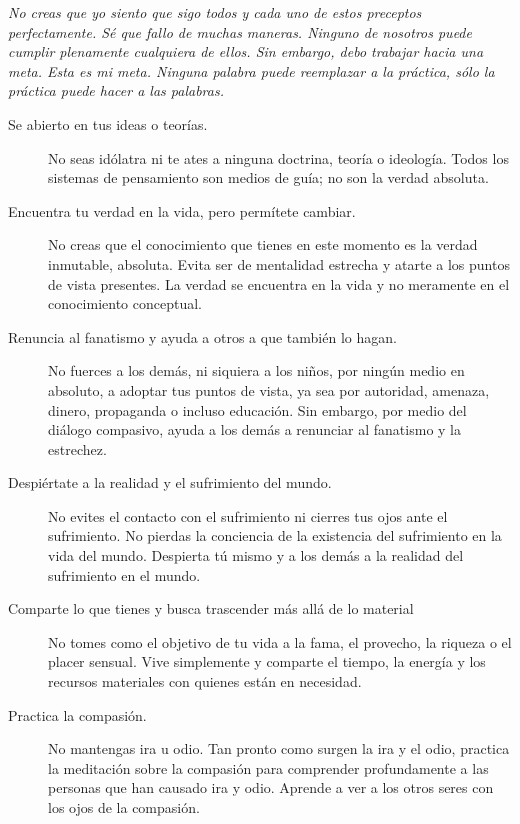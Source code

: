 \documentclass[11pt]{article}
\begin{document}
\thispagestyle{empty}

{\noindent\em No creas que yo siento que sigo todos y cada uno de estos preceptos perfectamente. Sé que fallo de muchas maneras. Ninguno de nosotros puede cumplir plenamente cualquiera de ellos. Sin embargo, debo trabajar hacia una meta. Esta es mi meta. Ninguna palabra puede reemplazar a la práctica, sólo la práctica puede hacer a las palabras.}

\begin{description}
\item[Se abierto en tus ideas o teorías.] No seas idólatra ni te ates a ninguna doctrina, teoría o ideología. Todos los sistemas de pensamiento son medios de guía; no son la verdad absoluta.

\item[Encuentra tu verdad en la vida, pero permítete cambiar.] No creas que el conocimiento que tienes en este momento es la verdad inmutable, absoluta. Evita ser de mentalidad estrecha y atarte a los puntos de vista presentes. La verdad se encuentra en la vida y no meramente en el conocimiento conceptual.

\item[Renuncia al fanatismo y ayuda a otros a que también lo hagan.] No fuerces a los demás, ni siquiera a los niños, por ningún medio en absoluto, a adoptar tus puntos de vista, ya sea por autoridad, amenaza, dinero, propaganda o incluso educación. Sin embargo, por medio del diálogo compasivo, ayuda a los demás a renunciar al fanatismo y la estrechez.

\item[Despiértate a la realidad y el sufrimiento del mundo.] No evites el contacto con el sufrimiento ni cierres tus ojos ante el sufrimiento. No pierdas la conciencia de la existencia del sufrimiento en la vida del mundo. Despierta tú mismo y a los demás a la realidad del sufrimiento en el mundo.

\item[Comparte lo que tienes y busca trascender más allá de lo material] No tomes como el objetivo de tu vida a la fama, el provecho, la riqueza o el placer sensual. Vive simplemente y comparte el tiempo, la energía y los recursos materiales con quienes están en necesidad.

\item[Practica la compasión.] No mantengas ira u odio. Tan pronto como surgen la ira y el odio, practica la meditación sobre la compasión para comprender profundamente a las personas que han causado ira y odio. Aprende a ver a los otros seres con los ojos de la compasión.


\end{description}
\end{document}
